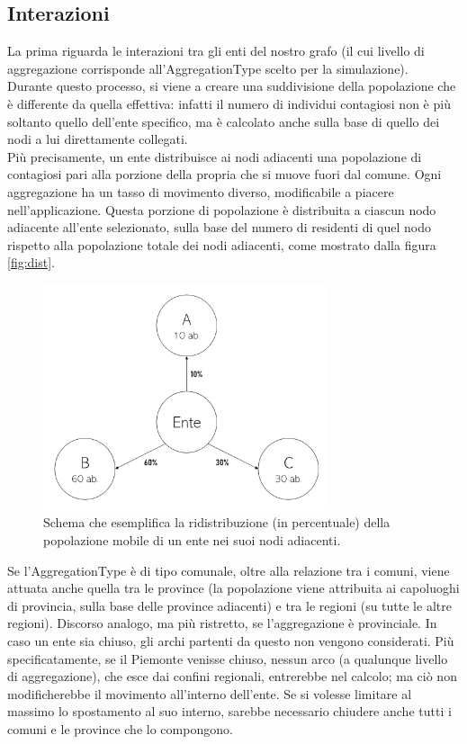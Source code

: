 \documentclass[a4paper, 12pt]{article}
\begin{document}
	\subsection{Interazioni}
		La prima riguarda le interazioni tra gli enti del nostro grafo (il cui livello di aggregazione corrisponde all'AggregationType scelto per la simulazione).\\
		Durante questo processo, si viene a creare una suddivisione della popolazione che è differente da quella effettiva: infatti il numero di individui contagiosi non è più soltanto quello dell'ente specifico, ma è calcolato anche sulla base di quello dei nodi a lui direttamente collegati.\\
		Più precisamente, un ente distribuisce ai nodi adiacenti una popolazione di contagiosi pari alla porzione della propria che si muove fuori dal comune.
		Ogni aggregazione ha un tasso di movimento diverso, modificabile a piacere nell'applicazione.
		Questa porzione di popolazione è distribuita a ciascun nodo adiacente all'ente selezionato, sulla base del numero di residenti di quel nodo rispetto alla popolazione totale dei nodi adiacenti, come mostrato dalla figura \vref{fig:dist}.
		\begin{figure}[H]
			\centering
			\includegraphics[width=0.75\textwidth]{IMG/diffusione.png}
			\caption[Ridistribuzione della popolazione]{Schema che esemplifica la ridistribuzione (in percentuale) della popolazione mobile di un ente nei suoi nodi adiacenti.}
			\label{fig:dist}
		\end{figure}
		Se l'AggregationType è di tipo comunale, oltre alla relazione tra i comuni, viene attuata anche quella tra le province (la popolazione viene attribuita ai capoluoghi di provincia, sulla base delle province adiacenti) e tra le regioni (su tutte le altre regioni). Discorso analogo, ma più ristretto, se l'aggregazione è provinciale.
		In caso un ente sia chiuso, gli archi partenti da questo non vengono considerati.
		Più specificatamente, se il Piemonte venisse chiuso, nessun arco (a qualunque livello di aggregazione), che esce dai confini regionali, entrerebbe nel calcolo; ma ciò non modificherebbe il movimento all'interno dell'ente. Se si volesse limitare al massimo lo spostamento al suo interno, sarebbe necessario chiudere anche tutti i comuni e le province che lo compongono.
		
\end{document}
